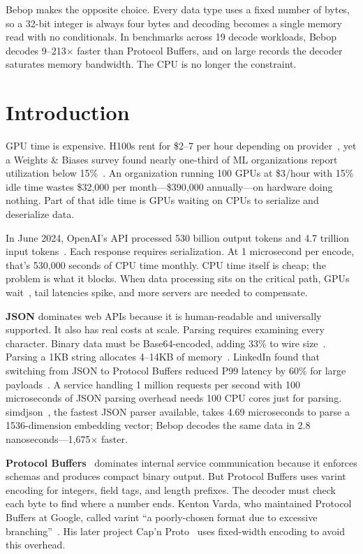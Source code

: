 \documentclass[11pt,onecolumn]{article}
\begin{document}
\vspace{0.15in}

Bebop makes the opposite choice. Every data type uses a fixed number of bytes, so a 32-bit integer is always four bytes and decoding becomes a single memory read with no conditionals. In benchmarks across 19 decode workloads, Bebop decodes 9--213$\times$ faster than Protocol Buffers, and on large records the decoder saturates memory bandwidth. The CPU is no longer the constraint.

\newpage


\section{Introduction}

GPU time is expensive. H100s rent for \$2--7 per hour depending on provider~\cite{gpu-pricing}, yet a Weights \& Biases survey found nearly one-third of ML organizations report utilization below 15\%~\cite{wandb-gpu}. An organization running 100 GPUs at \$3/hour with 15\% idle time wastes \$32,000 per month---\$390,000 annually---on hardware doing nothing. Part of that idle time is GPUs waiting on CPUs to serialize and deserialize data.

In June 2024, OpenAI's API processed 530 billion output tokens and 4.7 trillion input tokens~\cite{openai-api-analysis}. Each response requires serialization. At 1 microsecond per encode, that's 530,000 seconds of CPU time monthly. CPU time itself is cheap; the problem is what it blocks. When data processing sits on the critical path, GPUs wait~\cite{datastalls}, tail latencies spike, and more servers are needed to compensate.

\textbf{JSON} dominates web APIs because it is human-readable and universally supported. It also has real costs at scale. Parsing requires examining every character. Binary data must be Base64-encoded, adding 33\% to wire size~\cite{base64}. Parsing a 1KB string allocates 4--14KB of memory~\cite{cockroach-json}. LinkedIn found that switching from JSON to Protocol Buffers reduced P99 latency by 60\% for large payloads~\cite{linkedin-protobuf}. A service handling 1 million requests per second with 100 microseconds of JSON parsing overhead needs 100 CPU cores just for parsing. simdjson~\cite{simdjson}, the fastest JSON parser available, takes 4.69 microseconds to parse a 1536-dimension embedding vector; Bebop decodes the same data in 2.8 nanoseconds---1,675$\times$ faster.

\textbf{Protocol Buffers}~\cite{protobuf} dominates internal service communication because it enforces schemas and produces compact binary output. But Protocol Buffers uses varint encoding for integers, field tags, and length prefixes. The decoder must check each byte to find where a number ends. Kenton Varda, who maintained Protocol Buffers at Google, called varint ``a poorly-chosen format due to excessive branching''~\cite{varda-hn}. His later project Cap'n Proto~\cite{capnproto} uses fixed-width encoding to avoid this overhead.
\end{document}
